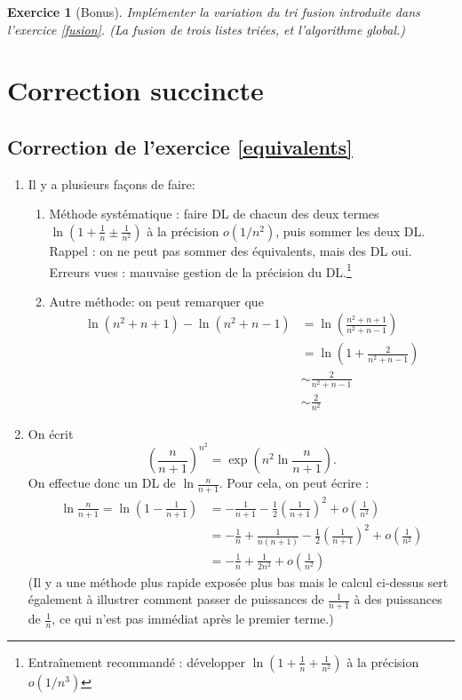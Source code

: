 \documentclass[11pt,a4paper]{article}
\newtheorem{ex}{Exercice}
\begin{document}
\begin{ex}[Bonus]\label{bonus}
Implémenter la variation du tri fusion introduite dans l'exercice \ref{fusion}. (La fusion de trois listes triées, et l'algorithme global.)
\end{ex}

\newpage

\section*{Correction succincte}

\subsection*{Correction de l'exercice \ref{equivalents}}
\begin{enumerate}
\item Il y a plusieurs façons de faire:
\begin{enumerate}
\item Méthode systématique : faire DL de chacun des deux termes $\ln\left(1+\frac1n\pm\frac{1}{n^2}\right)$ à la précision $o(1/n^2)$, puis sommer les deux DL. Rappel : on ne peut pas sommer des équivalents, mais des DL oui. Erreurs vues : mauvaise gestion de la précision du DL.\footnote{Entraînement recommandé : développer $\ln\left(1+\frac1n+\frac{1}{n^2}\right)$ à la précision $o(1/n^3)$}
\item Autre méthode: on peut remarquer que
\begin{align*}
\ln(n^2+n+1)-\ln(n^2+n-1)
&= \ln\left(\frac{n^2+n+1}{n^2+n-1}\right)\\
&= \ln\left(1+\frac{2}{n^2+n-1}\right)\\
&\sim \frac{2}{n^2+n-1}\\
&\sim \frac{2}{n^2}
\end{align*}
\end{enumerate}



\item On écrit 
\[ \left(\frac{n}{n+1}\right)^{n^2}
= \exp \left(n^2 \ln \frac{n}{n+1}\right).
\]
On effectue donc un DL de $\ln \frac{n}{n+1}$. Pour cela, on peut écrire :
\begin{align*}
\ln \frac{n}{n+1}
= \ln\left(1-\frac{1}{n+1}\right) 
&= -\frac{1}{n+1} - \frac12\left(\frac{1}{n+1}\right)^2+o\left(\frac{1}{n^2}\right)\\
&= -\frac{1}{n} +\frac{1}{n(n+1)}- \frac12\left(\frac{1}{n+1}\right)^2+o\left(\frac{1}{n^2}\right)\\
&= -\frac{1}{n} + \frac{1}{2n^2}+o\left(\frac{1}{n^2}\right)
\end{align*}
(Il y a une méthode plus rapide exposée plus bas mais le calcul ci-dessus sert également à illustrer comment passer de puissances de $\frac{1}{n+1}$ à des puissances de $\frac{1}{n}$, ce qui n'est pas immédiat après le premier terme.)


\end{enumerate}
\end{document}
